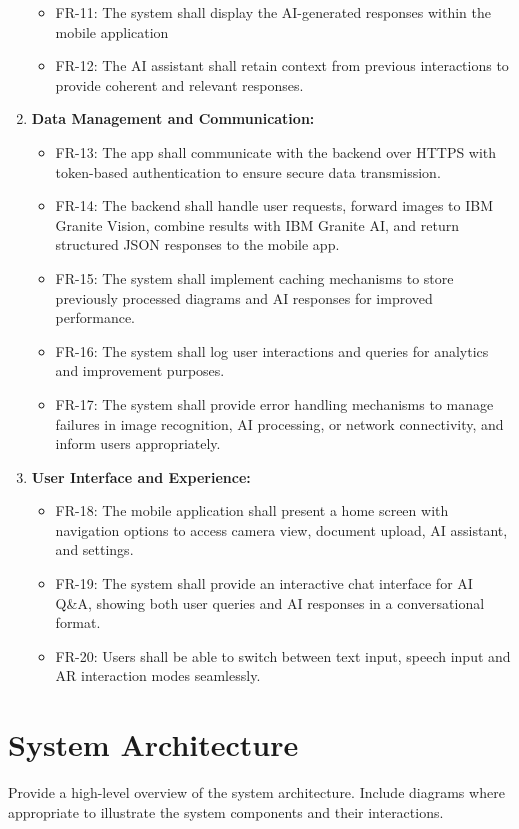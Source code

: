 \documentclass[10pt]{article}
\begin{document}
\begin{enumerate}
\begin{itemize}
                \item FR-11: The system shall display the AI-generated responses within the mobile application
                \item FR-12: The AI assistant shall retain context from previous interactions to provide coherent and relevant responses.
            \end{itemize}
        \item \textbf{Data Management and Communication:}
            \begin{itemize}
                \item FR-13: The app shall communicate with the backend over HTTPS with token-based authentication to ensure secure data transmission.
                \item FR-14: The backend shall handle user requests, forward images to IBM Granite Vision, combine results with IBM Granite AI, and return structured JSON responses to the mobile app.
                \item FR-15: The system shall implement caching mechanisms to store previously processed diagrams and AI responses for improved performance.
                \item FR-16: The system shall log user interactions and queries for analytics and improvement purposes.
                \item FR-17: The system shall provide error handling mechanisms to manage failures in image recognition, AI processing, or network connectivity, and inform users appropriately.
            \end{itemize}
        \item \textbf{User Interface and Experience:}
            \begin{itemize}
                \item FR-18: The mobile application shall present a home screen with navigation options to access camera view, document upload, AI assistant, and settings.
                \item FR-19: The system shall provide an interactive chat interface for AI Q&A, showing both user queries and AI responses in a conversational format.
                \item FR-20: Users shall be able to switch between text input, speech input and AR interaction modes seamlessly.
            \end{itemize}
    \end{enumerate}

\section{System Architecture}
Provide a high-level overview of the system architecture. Include diagrams where appropriate to illustrate the system components and their interactions.
\end{document}
